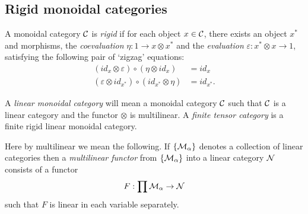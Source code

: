 \documentclass{amsart}
\begin{document}
\subsection{Rigid monoidal categories}


\begin{definition} \label{def:rigid}
	A monoidal category $\mathcal C$ is {\em rigid} if for each object $x \in \mathcal C$, there exists an object $x^*$ and morphisms, the {\em coevaluation} $\eta: 1 \to x \otimes x^*$ and the {\em evaluation} $\varepsilon: x^* \otimes x \to 1$, satisfying the following pair of `zigzag' equations:
	\begin{align*}
		(id_{x} \otimes \varepsilon  ) \circ (  \eta \otimes id_{x}) &= id_{x} \\
		(\varepsilon \otimes id_{x^*}) \circ (id_{x^*} \otimes \eta) &= id_{x^*}.
	\end{align*}
\end{definition}


\begin{definition}
	A {\em linear monoidal category} will mean a monoidal category $\mathcal C$ such that $\mathcal C$ is a linear category and the functor $\otimes$ is multilinear. A {\em finite tensor category} is a finite rigid linear monoidal category.  
\end{definition}

	Here by multilinear we mean the following.  If $\{\mathcal M_\alpha\}$ denotes a collection of linear categories then a {\em multilinear functor} from $\{\mathcal M_\alpha\}$ into a linear category $\mathcal N$ consists of a functor
\begin{equation*}
	F: \prod \mathcal M_\alpha \to \mathcal N
\end{equation*}
such that $F$ is linear in each variable separately. 


\end{document}
